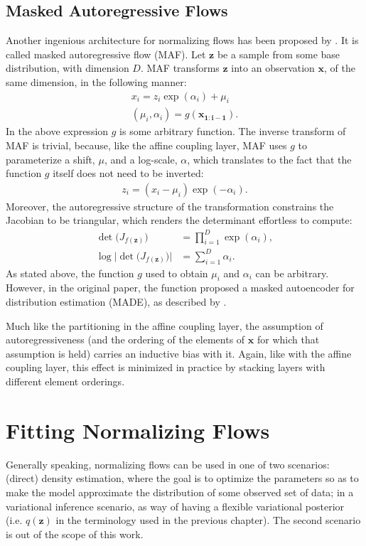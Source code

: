 \subsection{Masked Autoregressive Flows}
Another ingenious architecture for normalizing flows has been proposed by \textcite{maf}.
It is called masked autoregressive flow (MAF). Let $\bm{z}$ be a sample from
some base distribution, with dimension $D$. MAF transforms $\bm{z}$ into an
observation $\bm{x}$, of the same dimension, in the following manner:
\begin{align}
x_i = z_i \exp(\alpha_i) + \mu_i \\
(\mu_i, \alpha_i) = g(\bm{x_{1:i-1}}).
\end{align}
In the above expression $g$ is some arbitrary function. The inverse transform of
MAF is trivial, because, like the affine coupling layer, MAF uses $g$ to parameterize
a shift, $\mu$, and a log-scale, $\alpha$, which translates to the fact that the
function $g$ itself does not need to be inverted:
\begin{align}
z_i = (x_i - \mu_i)\exp(-\alpha_i).
\end{align}
Moreover, the autoregressive structure of the transformation constrains the
Jacobian to be triangular, which renders the determinant effortless to compute: 
\begin{align}
\det\big( J_{f(\bm{z})} \big) &= \prod_{i=1}^{D} \exp(\alpha_i), \\
\log \Big| \det \big( J_{f(\bm{z})} \big) \Big| &= \sum_{i=1}^{D} \alpha_i.
\end{align}
As stated above, the function $g$ used to obtain $\mu_i$ and $\alpha_i$ can be
arbitrary. However, in the original paper, the function proposed a masked
autoencoder for distribution estimation (MADE), as described by \textcite{MADE}.

Much like the partitioning in the affine coupling layer, the assumption of
autoregressiveness (and the ordering of the elements of $\bm{x}$
for which that assumption is held) carries an inductive bias with it. Again,
like with the affine coupling layer, this effect is minimized in practice by
stacking layers with different element orderings.

\section{Fitting Normalizing Flows}

Generally speaking, normalizing flows can be used in one of two scenarios:
(direct) density estimation, where the goal is to optimize the parameters
so as to make the model approximate the distribution of some observed set of data;
in a variational inference scenario, as way of having a flexible variational
posterior (i.e. $q(\bm{z})$ in the terminology used in the previous chapter). The
second scenario is out of the scope of this work.

